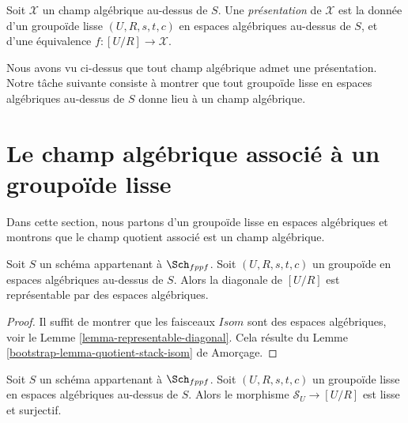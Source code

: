 \begin{definition}
\label{definition-presentation}
Soit $\mathcal{X}$ un champ algébrique au-dessus de $S$.
Une {\it présentation} de $\mathcal{X}$ est la donnée d'un groupoïde lisse
$(U, R, s, t, c)$ en espaces algébriques au-dessus de $S$, et d'une
équivalence $f : [U/R] \to \mathcal{X}$.
\end{definition}

\noindent
Nous avons vu ci-dessus que tout champ algébrique admet une présentation.
Notre tâche suivante consiste à montrer que tout groupoïde lisse en espaces
algébriques au-dessus de $S$ donne lieu à un champ algébrique.


\section{Le champ algébrique associé à un groupoïde lisse}
\label{section-smooth-groupoid-gives-algebraic-stack}

\noindent
Dans cette section, nous partons d'un groupoïde lisse en espaces algébriques
et montrons que le champ quotient associé est un champ algébrique.

\begin{lemma}
\label{lemma-diagonal-quotient-stack}
Soit $S$ un schéma appartenant à $\Sch_{fppf}$.
Soit $(U, R, s, t, c)$ un groupoïde en espaces algébriques au-dessus de $S$.
Alors la diagonale de $[U/R]$ est représentable par des espaces algébriques.
\end{lemma}

\begin{proof}
Il suffit de montrer que les faisceaux $\mathit{Isom}$ sont des espaces
algébriques, voir le
Lemme \ref{lemma-representable-diagonal}.
Cela résulte du
Lemme \ref{bootstrap-lemma-quotient-stack-isom} de Amorçage.
\end{proof}

\begin{lemma}
\label{lemma-smooth-quotient-smooth-presentation}
Soit $S$ un schéma appartenant à $\Sch_{fppf}$.
Soit $(U, R, s, t, c)$ un groupoïde lisse en espaces algébriques au-dessus de $S$.
Alors le morphisme $\mathcal{S}_U \to [U/R]$ est lisse et surjectif.
\end{lemma}

